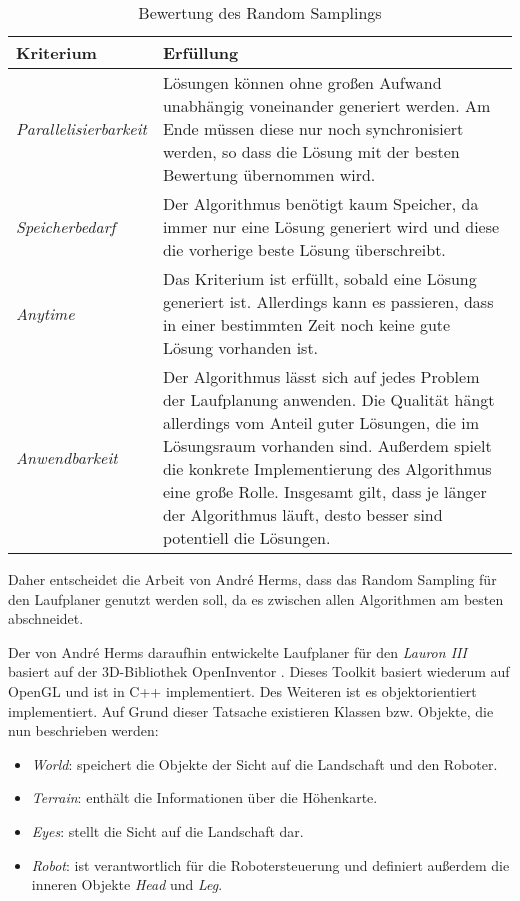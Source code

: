 \begin{table}[!t]
  \caption{Bewertung des Random Samplings}
  \label{Kap3:BewertungRandomSampling}
  \renewcommand{\arraystretch}{1.2}
  \centering
  \sffamily
  \begin{footnotesize}
    \begin{tabularx}{0.9\textwidth}{l X}
      \toprule
      \textbf{Kriterium} & \textbf{Erfüllung}\\
      \midrule
      \emph{Parallelisierbarkeit} & Lösungen können ohne großen Aufwand unabhängig voneinander generiert werden. Am Ende müssen diese nur noch synchronisiert werden, so dass die Lösung mit der besten Bewertung übernommen wird.\\
      \addlinespace
      \emph{Speicherbedarf} & Der Algorithmus benötigt kaum Speicher, da immer nur eine Lösung generiert wird und diese die vorherige beste Lösung überschreibt.\\
      \addlinespace
      \emph{Anytime} & Das Kriterium ist erfüllt, sobald eine Lösung generiert ist. Allerdings kann es passieren, dass in einer bestimmten Zeit noch keine gute Lösung vorhanden ist.\\
      \addlinespace
      \emph{Anwendbarkeit} & Der Algorithmus lässt sich auf jedes Problem der Laufplanung anwenden. Die Qualität hängt allerdings vom Anteil guter Lösungen, die im Lösungsraum vorhanden sind. Außerdem spielt die konkrete Implementierung des Algorithmus eine große Rolle. Insgesamt gilt, dass je länger der Algorithmus läuft, desto besser sind potentiell die Lösungen.\\
      \bottomrule
    \end{tabularx}
  \end{footnotesize}
  \rmfamily
\end{table}

Daher entscheidet die Arbeit von André Herms, dass das Random Sampling für den Laufplaner genutzt werden soll, da es zwischen allen Algorithmen am besten abschneidet.

Der von André Herms daraufhin entwickelte Laufplaner für den \emph{Lauron III} basiert auf der 3D-Bibliothek OpenInventor \autocite{inventor}. Dieses Toolkit basiert wiederum auf OpenGL und ist in C++ implementiert. Des Weiteren ist es objektorientiert implementiert. Auf Grund dieser Tatsache existieren Klassen bzw. Objekte, die nun beschrieben werden:
\begin{itemize}
  \item \emph{World}: speichert die Objekte der Sicht auf die Landschaft und den Roboter. 
  \item \emph{Terrain}: enthält die Informationen über die Höhenkarte.
  \item \emph{Eyes}: stellt die Sicht auf die Landschaft dar.
  \item \emph{Robot}: ist verantwortlich für die Robotersteuerung und definiert außerdem die inneren Objekte \emph{Head} und \emph{Leg}.
\end{itemize}  
  
